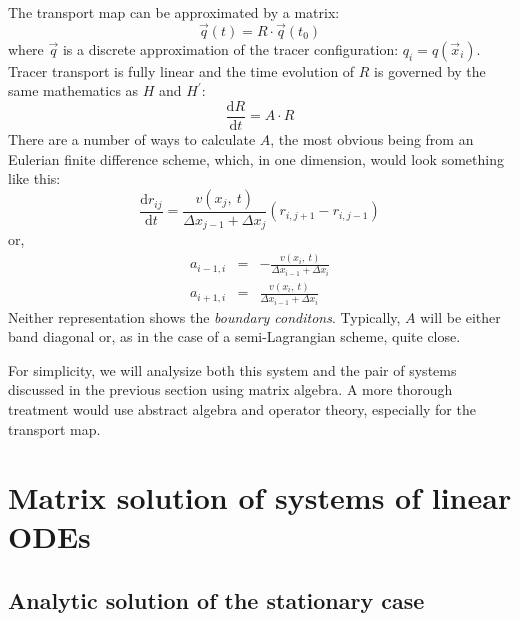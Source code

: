 \documentclass[11pt]{article}
\begin{document}
The transport map can be approximated by a matrix:
\begin{equation}
\vec q(t) = R \cdot \vec q(t_0)
\end{equation}
where $\vec q$ is a discrete approximation of the tracer configuration:
$q_i = q(\vec x_i)$.  Tracer transport is fully linear and the time evolution
of $R$ is governed by the same mathematics as $H$ and $H^\prime$:
\begin{equation}
\frac{\mathrm d R}{\mathrm d t} = A \cdot R
\label{discrete_tracer_map}
\end{equation}
There are a number of ways to calculate $A$, the most obvious being from an 
Eulerian finite difference scheme, which, in one dimension, would look something
like this:
\begin{equation}
\frac{\mathrm d r_{ij}}{\mathrm d t} = \frac{v(x_j,~t)}{\Delta x_{j-1}+\Delta x_j} (r_{i,j+1} - r_{i,j-1})
\label{simple_finite_difference}
\end{equation}
or,
\begin{eqnarray}
a_{i-1,i} & = & - \frac{v(x_i,~t)}{\Delta x_{i-1}+\Delta x_i} \\
a_{i+1,i} & = & \frac{v(x_i,~t)}{\Delta x_{i-1}+\Delta x_i}
\end{eqnarray}
Neither representation shows the {\it boundary conditons}.  Typically, $A$
will be either band diagonal or, as in the case of a semi-Lagrangian
scheme, quite close.

For simplicity, we will analysize both this system and the pair of systems
discussed in the previous section using matrix algebra.  A more thorough
treatment would use abstract algebra and operator theory, especially for
the transport map.

\section{Matrix solution of systems of linear ODEs} 

\subsection{Analytic solution of the stationary case}
\end{document}
